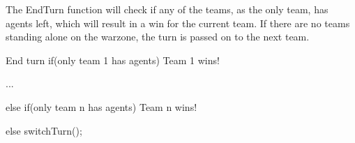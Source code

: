 The EndTurn function will check if any of the teams, as the only team, has agents left, which will result in a win for the current team. If there are no teams standing alone on the warzone, the turn is passed on to the next team.
\begin{source}{End turn}{}
if(only team 1 has agents)
{
	Team 1 wins!
}

...

else if(only team n has agents)
{
	Team n wins!
}

else
{
	switchTurn();
}
\end{source}